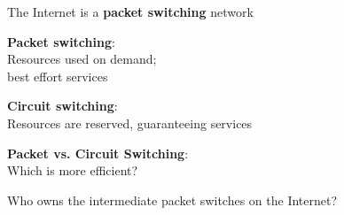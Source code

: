 \begin{frame}\begin{center}\large
The Internet is a \textbf{packet switching} network
\end{center}\end{frame}

\begin{frame}\begin{center}\large
\textbf{Packet switching}:\\\large Resources used on demand;\\best effort services
\end{center}\end{frame}

\begin{frame}\begin{center}\large
\textbf{Circuit switching}:\\\large Resources are reserved, guaranteeing services
\end{center}\end{frame}

\begin{frame}\begin{center}\large
\textbf{Packet vs. Circuit Switching}:\\\large Which is more efficient?
\end{center}\end{frame}

\begin{frame} \begin{center}\large
Who owns the intermediate packet switches on the Internet?
\end{center}\end{frame}

